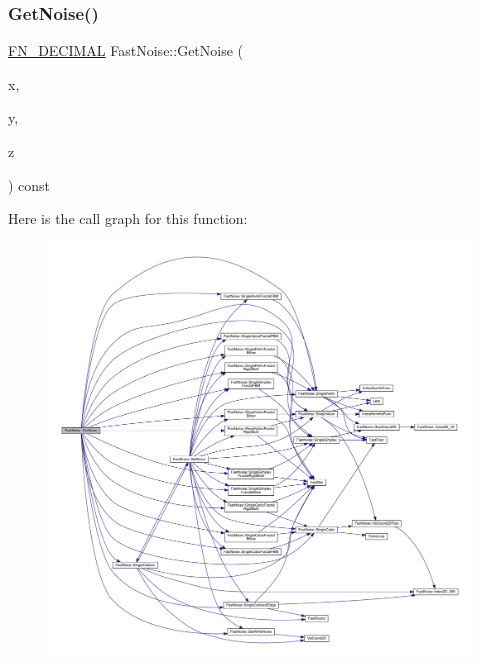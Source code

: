 \subsubsection{\texorpdfstring{Get\+Noise()}{GetNoise()}\hspace{0.1cm}{\footnotesize\ttfamily [2/2]}}
{\footnotesize\ttfamily \mbox{\hyperlink{_fast_noise_8h_a75a9ef6d2541c4921815b885bfd449c3}{F\+N\+\_\+\+D\+E\+C\+I\+M\+AL}} Fast\+Noise\+::\+Get\+Noise (\begin{DoxyParamCaption}\item[{\mbox{\hyperlink{_fast_noise_8h_a75a9ef6d2541c4921815b885bfd449c3}{F\+N\+\_\+\+D\+E\+C\+I\+M\+AL}}}]{x,  }\item[{\mbox{\hyperlink{_fast_noise_8h_a75a9ef6d2541c4921815b885bfd449c3}{F\+N\+\_\+\+D\+E\+C\+I\+M\+AL}}}]{y,  }\item[{\mbox{\hyperlink{_fast_noise_8h_a75a9ef6d2541c4921815b885bfd449c3}{F\+N\+\_\+\+D\+E\+C\+I\+M\+AL}}}]{z }\end{DoxyParamCaption}) const}

Here is the call graph for this function\+:
\nopagebreak
\begin{figure}[H]
\begin{center}
\leavevmode
\includegraphics[width=350pt]{class_fast_noise_a0d9b7a6858a599cde4dc5b8f74264ae0_cgraph}
\end{center}
\end{figure}
\mbox{\label{class_fast_noise_aea513db44077037f31452d05f06d11e0}} 
